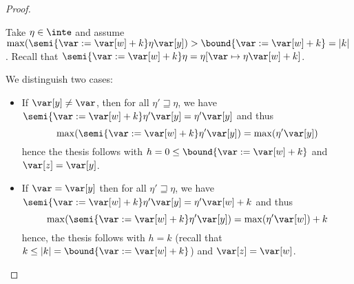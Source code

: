 \begin{proof}
\begin{inductive}
    
    Take \(\eta \in \inte\) and assume
    \(\max(\semi{\var := \var[w] + k}\eta \var[y]) > \bound{\var :=
      \var[w] + k} = |k|\).
    Recall that
    \(\semi{\var := \var[w] + k}\eta = \eta[\var \mapsto \eta \var[w] + k]\).
    
    We distinguish two cases:
    \begin{itemize}
      
    \item If \(\var[y] \neq \var\), then for all \(\eta' \sqsupseteq \eta\), we have
      \(\semi{\var := \var[w] + k}\eta' \var[y] = \eta' \var[y]\) and thus
      \begin{equation*}
        \max(\semi{\var := \var[w] + k}\eta' \var[y]) = \max(\eta' \var[y])
      \end{equation*}
      hence the thesis follows with
      \(h =0 \leq \bound{\var := \var[w] + k}\) and \(\var[z] = \var[y]\).
      
    \item 
      If \(\var = \var[y]\) then  for all \(\eta' \sqsupseteq \eta\), we have
      \(\semi{\var := \var[w] + k}\eta' \var[y] = \eta' \var[w] +
      k\) and thus
      \begin{equation*}
        \max(\semi{\var := \var[w] + k}\eta' \var[y]) = \max(\eta' \var[w]) +
        k
      \end{equation*}
      hence, the thesis follows with \(h = k\) (recall that
      \(k \leq |k| = \bound{\var := \var[w] + k}\)) and
      \(\var[z] = \var[w]\).
    \end{itemize}

    
    
    
    

\end{inductive}
\end{proof}
